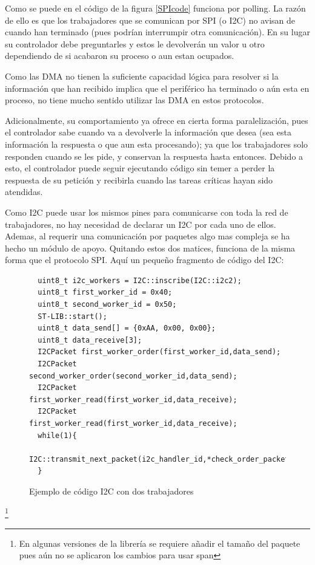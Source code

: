 \documentclass{report}
\begin{document}
\par \vspace{0.3cm}
Como se puede en el código de la figura \ref{SPIcode} funciona por polling. La razón de ello es que los trabajadores que se comunican por SPI (o I2C) no avisan de cuando han terminado (pues podrían interrumpir otra comunicación). En su lugar su controlador debe preguntarles y estos le devolverán un valor u otro dependiendo de si acabaron su proceso o aun estan ocupados. \par
Como las DMA no tienen la suficiente capacidad lógica para resolver si la información que han recibido implica que el periférico ha terminado o aún esta en proceso, no tiene mucho sentido utilizar las DMA en estos protocolos. \par 
Adicionalmente, su comportamiento ya ofrece en cierta forma paralelización, pues el controlador sabe cuando va a devolverle la información que desea (sea esta información la respuesta o que aun esta procesando); ya que los trabajadores solo responden cuando se les pide, y conservan la respuesta hasta entonces. Debido a esto, el controlador puede seguir ejecutando código sin temer a perder la respuesta de su petición y recibirla cuando las tareas críticas hayan sido atendidas. 
\par \vspace{0.3cm}
Como I2C puede usar los mismos pines para comunicarse con toda la red de trabajadores, no hay necesidad de declarar un I2C por cada uno de ellos. Ademas, al requerir una comunicación por paquetes algo mas compleja se ha hecho un módulo de apoyo. Quitando estos dos matices, funciona de la misma forma que el protocolo SPI. Aquí un pequeño fragmento de código del I2C:
\begin{figure}[h]
\begin{lstlisting}
  uint8_t i2c_workers = I2C::inscribe(I2C::i2c2);
  uint8_t first_worker_id = 0x40;
  uint8_t second_worker_id = 0x50;
  ST-LIB::start();
  uint8_t data_send[] = {0xAA, 0x00, 0x00}; 
  uint8_t data_receive[3]; 
  I2CPacket first_worker_order(first_worker_id,data_send);
  I2CPacket second_worker_order(second_worker_id,data_send);
  I2CPacket first_worker_read(first_worker_id,data_receive);
  I2CPacket first_worker_read(first_worker_id,data_receive);
  while(1){
    I2C::transmit_next_packet(i2c_handler_id,*check_order_packet);
  }
\end{lstlisting}
\caption{Ejemplo de código I2C con dos trabajadores}
\label{I2Ccode}
\end{figure}
\footnote{En algunas versiones de la librería se requiere añadir el tamaño del paquete pues aún no se aplicaron los cambios para usar span}
\par \vspace{0.3cm}
\end{document}
